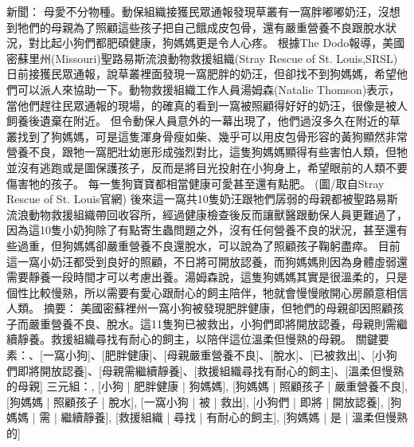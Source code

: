 \vspace{3mm}
\noindent
\begin{tcolorbox}[promptstyle, title={Example news, essential aspects, triples, and summary (V3)}]
新聞：\newline
母愛不分物種。動保組織接獲民眾通報發現草叢有一窩胖嘟嘟奶汪，沒想到牠們的母親為了照顧這些孩子把自己餓成皮包骨，還有嚴重營養不良跟脫水狀況，對比起小狗們都肥碩健康，狗媽媽更是令人心疼。\newline
根據The Dodo報導，美國密蘇里州(Missouri)聖路易斯流浪動物救援組織(Stray Rescue of St. Louis,SRSL)日前接獲民眾通報，說草叢裡面發現一窩肥胖的奶汪，但卻找不到狗媽媽，希望他們可以派人來協助一下。動物救援組織工作人員湯姆森(Natalie Thomson)表示，當他們趕往民眾通報的現場，的確真的看到一窩被照顧得好好的奶汪，很像是被人飼養後遺棄在附近。\newline
但令動保人員意外的一幕出現了，他們過沒多久在附近的草叢找到了狗媽媽，可是這隻渾身骨瘦如柴、幾乎可以用皮包骨形容的黃狗顯然非常營養不良，跟牠一窩肥壯幼崽形成強烈對比，這隻狗媽媽顯得有些害怕人類，但牠並沒有逃跑或是圖保護孩子，反而是將目光投射在小狗身上，希望眼前的人類不要傷害牠的孩子。\newline
每一隻狗寶寶都相當健康可愛甚至還有點肥。 (圖/取自Stray Rescue of St. Louis官網)\newline
後來這一窩共10隻奶汪跟牠們孱弱的母親都被聖路易斯流浪動物救援組織帶回收容所，經過健康檢查後反而讓獸醫跟動保人員更難過了，因為這10隻小奶狗除了有點寄生蟲問題之外，沒有任何營養不良的狀況，甚至還有些過重，但狗媽媽卻嚴重營養不良還脫水，可以說為了照顧孩子鞠躬盡瘁。\newline
目前這一窩小奶汪都受到良好的照顧，不日將可開放認養，而狗媽媽則因為身體虛弱還需要靜養一段時間才可以考慮出養。湯姆森說，這隻狗媽媽其實是很溫柔的，只是個性比較慢熟，所以需要有愛心跟耐心的飼主陪伴，牠就會慢慢敞開心房願意相信人類。\newline
\newline
摘要：\newline
美國密蘇裡州一窩小狗被發現肥胖健康，但牠們的母親卻因照顧孩子而嚴重營養不良、脫水。這11隻狗已被救出，小狗們即將開放認養，母親則需繼續靜養。救援組織尋找有耐心的飼主，以陪伴這位溫柔但慢熟的母親。\newline
\newline
關鍵要素：\newline
[美國密蘇裡州]、[一窩小狗]、[肥胖健康]、[母親嚴重營養不良]、[脫水]、[已被救出]、[小狗們即將開放認養]、[母親需繼續靜養]、[救援組織尋找有耐心的飼主]、[溫柔但慢熟的母親]\newline
\newline
三元組：, [小狗 | 肥胖健康 | 狗媽媽], [狗媽媽 | 照顧孩子 | 嚴重營養不良], [狗媽媽 | 照顧孩子 | 脫水], [一窩小狗 | 被 | 救出], [小狗們 | 即將 | 開放認養], [狗媽媽 | 需 | 繼續靜養], [救援組織 | 尋找 | 有耐心的飼主], [狗媽媽 | 是 | 溫柔但慢熟的]
\end{tcolorbox}

